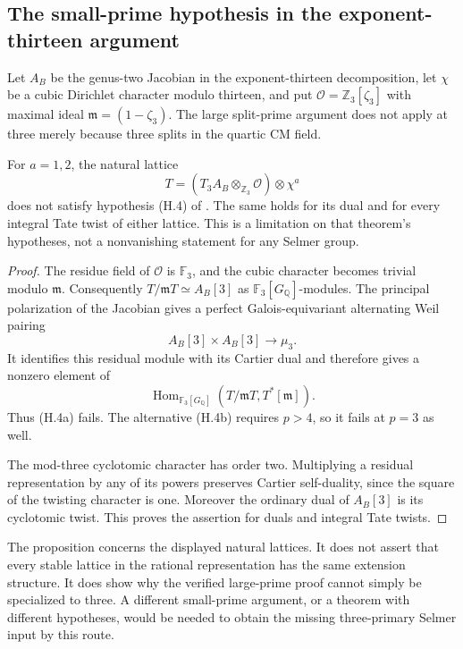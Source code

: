 \subsection{The small-prime hypothesis in the exponent-thirteen argument}
\label{subsec:thirteen-small-prime-gate}

Let $A_B$ be the genus-two Jacobian in the exponent-thirteen
decomposition, let $\chi$ be a cubic Dirichlet character modulo
thirteen, and put $\mathcal O=\mathbb Z_3[\zeta_3]$ with maximal
ideal $\mathfrak m=(1-\zeta_3)$.  The large split-prime argument
does not apply at three merely because three splits in the quartic
CM field.

\begin{proposition}
\label{prop:thirteen-small-prime-mr}
For $a=1,2$, the natural lattice
\[
 T=(T_3A_B\otimes_{\mathbb Z_3}\mathcal O)\otimes\chi^a
\]
does not satisfy hypothesis (H.4) of
\citet[\S3.5, p.~27]{MazurRubin2004}.  The same holds for its
dual and for every integral Tate twist of either lattice.
This is a limitation on that theorem's hypotheses, not a
nonvanishing statement for any Selmer group.
\end{proposition}
\begin{proof}
The residue field of $\mathcal O$ is $\mathbb F_3$, and the
cubic character becomes trivial modulo $\mathfrak m$.  Consequently
$T/\mathfrak mT\simeq A_B[3]$ as $\mathbb F_3[G_{\mathbb Q}]$-modules.
The principal polarization of the Jacobian gives a perfect
Galois-equivariant alternating Weil pairing
\[
 A_B[3]\times A_B[3]\longrightarrow\mu_3.
\]
It identifies this residual module with its Cartier dual and
therefore gives a nonzero element of
\[
 \operatorname{Hom}_{\mathbb F_3[G_{\mathbb Q}]}
       (T/\mathfrak mT,T^*[\mathfrak m]).
\]
Thus (H.4a) fails.  The alternative (H.4b) requires $p>4$, so
it fails at $p=3$ as well.

The mod-three cyclotomic character has order two.  Multiplying
a residual representation by any of its powers preserves
Cartier self-duality, since the square of the twisting character
is one.  Moreover the ordinary dual of $A_B[3]$ is its
cyclotomic twist.  This proves the assertion for duals and
integral Tate twists.
\end{proof}

The proposition concerns the displayed natural lattices.  It does
not assert that every stable lattice in the rational representation
has the same extension structure.  It does show why the verified
large-prime proof cannot simply be specialized to three.  A
different small-prime argument, or a theorem with different
hypotheses, would be needed to obtain the missing three-primary
Selmer input by this route.

